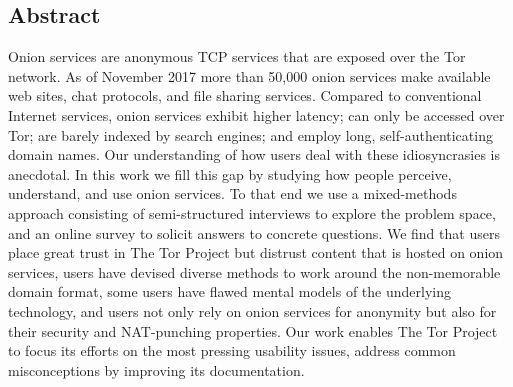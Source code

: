 \subsection*{Abstract}
Onion services are anonymous TCP services that are exposed over the Tor network.
As of November 2017 more than 50,000 onion services make available web sites,
chat protocols, and file sharing services.  Compared to conventional Internet
services, onion services exhibit higher latency; can only be accessed over Tor;
are barely indexed by search engines; and employ long, self-authenticating
domain names.  Our understanding of how users deal with these idiosyncrasies is
anecdotal.
In this work we fill this gap by studying how people perceive, understand, and
use onion services.  To that end we use a mixed-methods approach consisting of
semi-structured interviews to explore the problem space, and an online survey to
solicit answers to concrete questions.  We find that \first users place great
trust in The Tor Project but distrust content that is hosted on onion services,
\second users have devised diverse methods to work around the non-memorable
domain format, \third some users have flawed mental models of the underlying
technology, and \fourth users not only rely on onion services for anonymity but
also for their security and NAT-punching properties.
Our work enables The Tor Project to focus its efforts on the most pressing
usability issues, address common misconceptions by improving its documentation.
